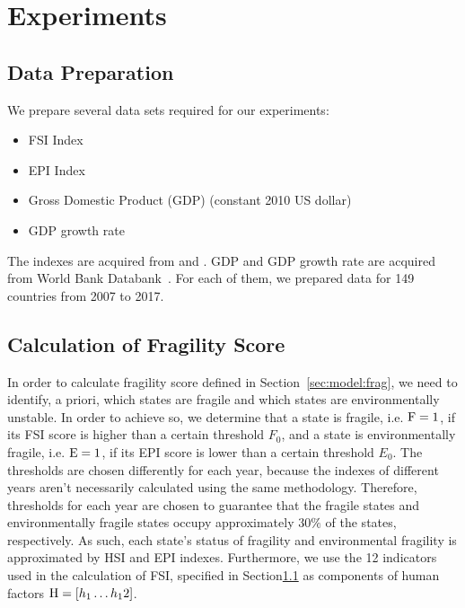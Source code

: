 \section{Experiments}
\label{sec:exp}
\subsection{Data Preparation}
\label{sec:exp:prep}


We prepare several data sets required for our experiments:

\begin{itemize}
   \item FSI Index
   \item EPI Index
   \item Gross Domestic Product (GDP) (constant 2010 US dollar) 
   \item GDP growth rate
\end{itemize}
The indexes are acquired from \cite{FSI_index} and \cite{EPI_index}.
GDP and GDP growth rate are acquired from World Bank Databank~\cite{world_bank}. For each of them, we prepared data for 149 countries from 2007 to 2017.

\subsection{Calculation of Fragility Score}
\label{sec:exp:frag}
In order to calculate fragility score defined in Section~\ref{sec:model:frag}, we need to identify, a priori, which states are fragile and which states are environmentally unstable. 
In order to achieve so, we determine that a state is fragile, i.e. $\operatorname*{F}=1$, if its FSI score is higher than a certain threshold $F_0$, and a state is environmentally fragile, i.e. $\operatorname*{E}=1$, if its EPI score is lower than a certain threshold $E_0$. 
The thresholds are chosen differently for each year, because the indexes of different years aren't necessarily calculated using the same methodology.
Therefore, thresholds for each year are chosen to guarantee that the fragile states and environmentally fragile states occupy approximately $30\%$ of the states, respectively. As such, each state's status of fragility and environmental fragility is approximated by HSI and EPI indexes. Furthermore, we use the 12 indicators used in the calculation of FSI, specified in Section\ref{sec:exp:prep} as components of human factors $\operatorname*{{H}} = \left[ h_1\ldots h_12 \right]$.

